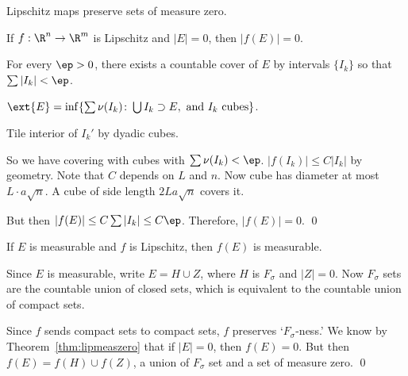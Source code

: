 Lipschitz maps preserve sets of measure zero.

\begin{thm} \label{thm:lipmeaszero}
If $f: \R^n \to \R^m$ is Lipschitz and $|E|=0$, then $|f(E)|=0$. 
\end{thm}

\pf For every $\ep>0$, there exists a countable cover of $E$ by intervals $\{I_k\}$ so that $\sum |I_k| < \ep$. 



$\ext{E}= \inf \{ \sum \nu(I_k) \colon \bigcup I_k \supset E, \text{ and }I_k \text{ cubes}\}$.

Tile interior of $I_k'$ by dyadic cubes. 

So we have covering with cubes with $\sum \nu(I_k)<\ep$. $|f(I_k)| \leq C |I_k|$ by geometry. Note that $C$ depends on $L$ and $n$. Now cube has diameter at most $L \cdot a \sqrt{n}$. A cube of side length $2L a \sqrt{n}$ covers it. 


But then $|f(E)| \leq C \sum |I_k| \leq C\ep$. Therefore, $|f(E)|=0$. \qed \\


\begin{thm}
If $E$ is measurable and $f$ is Lipschitz, then $f(E)$ is measurable.
\end{thm}

\pf Since $E$ is measurable, write $E= H \cup Z$, where $H$ is $F_\sigma$ and $|Z|=0$. Now $F_\sigma$ sets are the countable union of closed sets, which is equivalent to the countable union of compact sets. 



Since $f$ sends compact sets to compact sets, $f$ preserves `$F_\sigma$-ness.' We know by Theorem~\ref{thm:lipmeaszero} that if $|E|=0$, then $f(E)=0$. But then $f(E)= f(H) \cup f(Z)$, a union of $F_\sigma$ set and a set of measure zero. \qed \\










